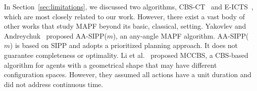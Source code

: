\documentclass[review]{elsarticle}
\newcommand{\ccbs}{\ac{CCBS}\xspace}
\newcommand{\cbs}{\ac{CBS}\xspace}
\newcommand{\sipp}{\ac{SIPP}\xspace}
\newcommand{\mapfr}{\ac{MAPF}$_R$\xspace}
\newcommand{\mapf}{\ac{MAPF}\xspace}
\newcommand{\shortcite}{\cite}
\begin{document}


 In Section~\ref{sec:limitations}, we discussed two algorithms, CBS-CT~\cite{cohen2019optimal} and E-ICTS~\cite{walker2018extended}, which are most closely related to our work.  
  However, there exist a vast body of other works that study \mapf beyond its basic, classical, setting. 
Yakovlev and Andreychuk~\shortcite{yakovlev2017anyAngle} proposed AA-SIPP($m$), an any-angle \ac{MAPF} algorithm. 
AA-SIPP($m$) is based on \sipp and adopts a prioritized planning approach. It does not guarantee completeness or optimality. 
Li et al.~\shortcite{li2019multi} proposed \ac{MCCBS}, a \cbs-based algorithm for agents with a geometrical shape that may have different configuration spaces. However, they assumed all actions have a unit duration and did not address continuous time. %
\end{document}
